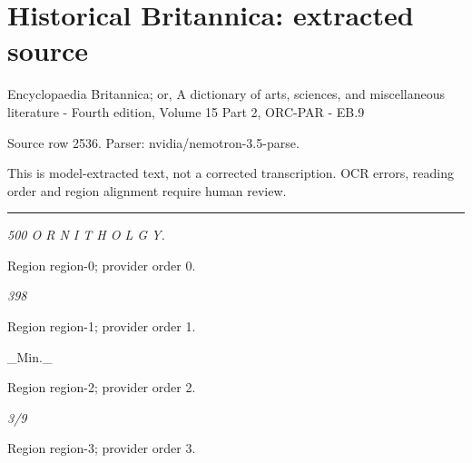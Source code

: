 \documentclass[11pt]{article}
\begin{document}
\section*{Historical Britannica: extracted source}
Encyclopaedia Britannica; or, A dictionary of arts, sciences, and miscellaneous literature - Fourth edition, Volume 15 Part 2, ORC-PAR - EB.9\par
{\small Source row 2536. Parser: nvidia/nemotron-3.5-parse.\par}
{\small This is model-extracted text, not a corrected transcription. OCR errors, reading order and region alignment require human review.\par}
\hrule\medskip
{\small\itshape 500 O R N I T H O L G Y.\par}

{\scriptsize\color{gray} Region region-0; provider order 0.\par}
\medskip

{\small\itshape 398\par}

{\scriptsize\color{gray} Region region-1; provider order 1.\par}
\medskip

\_Min.\_
\par

{\scriptsize\color{gray} Region region-2; provider order 2.\par}
\medskip

{\small\itshape 3/9\par}

{\scriptsize\color{gray} Region region-3; provider order 3.\par}
\medskip
\end{document}
